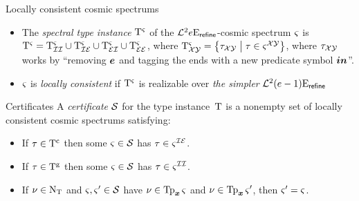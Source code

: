 \documentclass{beamer}
\begin{document}
\begin{frame}{Locally consistent cosmic spectrums}
\begin{itemize}
\item The \emph{spectral type instance} $\mathrm{T}^{\varsigma}$ of the
$\mathcal{L}^{2}{e}\mathrm{E}_{\mathsf{refine}}$-cosmic spectrum $\varsigma$ is $\mathrm{T}^{\varsigma} = \mathrm{T}^{\varsigma}_{\mathcal{I}\mathcal{I}} \cup \mathrm{T}^{\varsigma}_{\mathcal{I}\mathcal{E}} \cup \mathrm{T}^{\varsigma}_{\mathcal{E}\mathcal{I}} \cup \mathrm{T}^{\varsigma}_{\mathcal{E}\mathcal{E}}$,
where $\mathrm{T}^{\varsigma}_{\mathcal{X}{\mathcal{Y}}} =
\left\{\tau_{\mathcal{X}{\mathcal{Y}}}\mathrel{}\middle|\mathrel{}\tau\in\varsigma^{\mathcal{X}\mathcal{Y}}\right\}$,
where $\tau_{\mathcal{X}{\mathcal{Y}}}$ works by ``removing $\bm{e}$ and tagging
the ends with a new predicate symbol $\bm{in}$''.

\item $\varsigma$ is \emph{locally consistent} if $\mathrm{T}^{\varsigma}$ is realizable over
\emph{the simpler} $\mathcal{L}^{2}{(e-1)}\mathrm{E}_{\mathsf{refine}}$

\end{itemize}
\end{frame}

\begin{frame}{Certificates}
A \emph{certificate} $\mathcal{S}$ for the type instance~$\mathrm{T}$ is a nonempty set of
locally consistent cosmic spectrums satisfying:
\begin{itemize}
  \item[\condcertTc]\label{cond:certTc}
  If $\tau\in\mathrm{T}^{\mathrm{c}}$ then some $\varsigma\in\mathcal{S}$ has $\tau\in\varsigma^{\mathcal{I}\mathcal{E}}$.
  \item[\condcertTg]\label{cond:certTg}
  If $\tau\in\mathrm{T}^{\mathrm{g}}$ then some $\varsigma\in\mathcal{S}$ has $\tau\in\varsigma^{\mathcal{I}\mathcal{I}}$.
  \item[\condcertn]\label{cond:certn}
  If $\nu\in{\mathrm{N}}_{\mathrm{T}}$ and $\varsigma,{\varsigma'}\in\mathcal{S}$ have $\nu\in\operatorname{Tp}_{\bm{x}}{\varsigma}$ and
  $\nu\in\operatorname{Tp}_{\bm{x}}{{\varsigma'}}$, then ${\varsigma'} = \varsigma$.
\end{itemize}
\end{frame}
\end{document}
